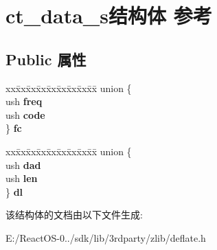 \hypertarget{structct__data__s}{}\section{ct\+\_\+data\+\_\+s结构体 参考}
\label{structct__data__s}
\subsection*{Public 属性}
\begin{DoxyCompactItemize}
\item 
\mbox{\label{structct__data__s_ad793d03414ffa2a5f1c9216644232647}} 
\begin{tabbing}
xx\=xx\=xx\=xx\=xx\=xx\=xx\=xx\=xx\=\kill
union \{\\
\>ush {\bfseries freq}\\
\>ush {\bfseries code}\\
\} {\bfseries fc}\\

\end{tabbing}\item 
\mbox{\label{structct__data__s_a266835b0692cfd95fb899289b033d7d7}} 
\begin{tabbing}
xx\=xx\=xx\=xx\=xx\=xx\=xx\=xx\=xx\=\kill
union \{\\
\>ush {\bfseries dad}\\
\>ush {\bfseries len}\\
\} {\bfseries dl}\\

\end{tabbing}\end{DoxyCompactItemize}


该结构体的文档由以下文件生成\+:\begin{DoxyCompactItemize}
\item 
E\+:/\+React\+O\+S-\/0../sdk/lib/3rdparty/zlib/deflate.\+h\end{DoxyCompactItemize}
